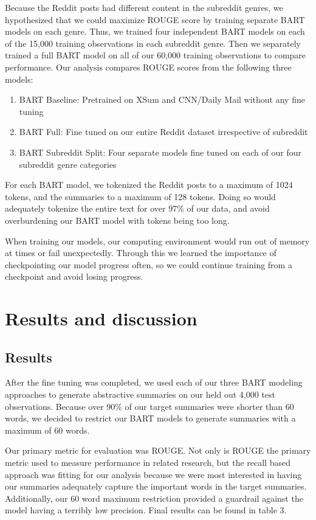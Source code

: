 \documentclass[11pt,a4paper, twocolumn]{article}
\begin{document}
Because the Reddit posts had different content in the subreddit genres, 
we hypothesized that we could maximize ROUGE score by training separate BART models on each genre.
Thus, we trained four independent BART models on each of the 15,000 training observations in each subreddit genre. 
Then we separately trained a full BART model on all of our 60,000 training observations to compare performance. 
Our analysis compares ROUGE scores from the following three models:

\begin{enumerate}
  \item BART Baseline: Pretrained on XSum and CNN/Daily Mail without any fine tuning
  \item BART Full: Fine tuned on our entire Reddit dataset irrespective of subreddit
  \item BART Subreddit Split: Four separate models fine tuned on each of our four subreddit genre categories
\end{enumerate}

For each BART model, we tokenized the Reddit posts to a maximum of 1024 tokens, and the summaries to a maximum of 128 tokens. 
Doing so would adequately tokenize the entire text for over 97\% of our data, and avoid overburdening our BART model with tokens being too long. 

When training our models, our computing environment would run out of memory at times or fail unexpectedly. 
Through this we learned the importance of checkpointing our model progress often, so we could continue training from a checkpoint and avoid losing progress. 

\section{Results and discussion}

\subsection{Results}

After the fine tuning was completed, we used each of our three BART modeling approaches to generate abstractive summaries on 
our held out 4,000 test observations. Because over 90\% of our target summaries were shorter than 60 words, we decided to 
restrict our BART models to generate summaries with a maximum of 60 words. 

Our primary metric for evaluation was ROUGE. 
Not only is ROUGE the primary metric used to measure performance in related research, 
but the recall based approach was fitting for our analysis because we were most interested in having our summaries adequately capture the important words in the target summaries. 
Additionally, our 60 word maximum restriction provided a guardrail against the model having a terribly low precision.
Final results can be found in table 3. 
\end{document}
